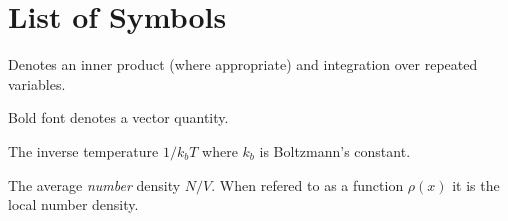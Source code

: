 \label{sec:list_of_syms}

\chapter*{List of Symbols}

\begin{description}[labelsep=1cm]
    \item[$\ast$] Denotes an inner product (where appropriate) and
        integration over repeated variables.
    \item[$\mathbf{b}$] Bold font denotes a vector quantity.
    \item[$\beta$] The inverse temperature $1 / k_b T$ where $k_b$ is 
        Boltzmann's constant.
    \item[$\rho$] The average \textit{number} density $N/V$. When refered to as a
        function $\rho(x)$ it is the local number density.
\end{description}
